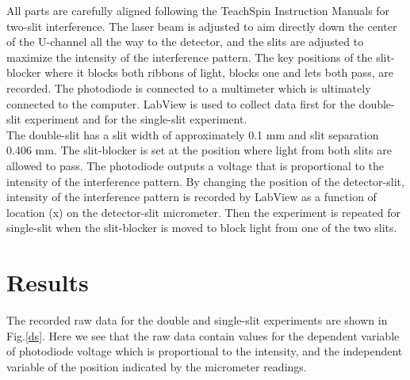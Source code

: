 \documentclass[prb,preprint]{revtex4-1}
\begin{document}
All parts are carefully aligned following the TeachSpin Instruction Manuals for two-slit interference. The laser beam is adjusted to aim directly down the center of the U-channel all the way to the detector, and the slits are adjusted to maximize the intensity of the interference pattern. The key positions of the slit-blocker where it blocks both ribbons of light, blocks one and lets both pass, are recorded. The photodiode is connected to a multimeter which is ultimately connected to the computer. LabView is used to collect data first for the double-slit experiment and for the single-slit experiment. \\

The double-slit has a slit width of approximately 0.1 mm and slit separation 0.406 mm. The slit-blocker is set at the position where light from both slits are allowed to pass. The photodiode outputs a voltage that is proportional to the intensity of the interference pattern. By changing the position of the detector-slit, intensity of the interference pattern is recorded by LabView as a function of location (x) on the detector-slit micrometer. Then the experiment is repeated for single-slit when the slit-blocker is moved to block light from one of the two slits. \\

\newpage

\section{Results}

The recorded raw data for the double and single-slit experiments are shown in Fig.\ref{ds}.  Here we see that the raw data contain values for the dependent variable of photodiode voltage which is proportional to the intensity, and the independent variable of the position indicated by the micrometer readings.
\end{document}
